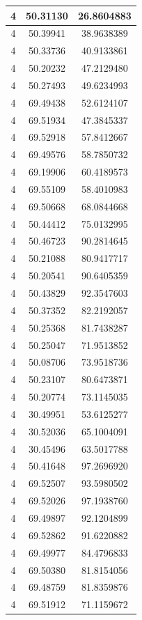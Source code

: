 \documentclass[
]{book}
\begin{document}
\begin{tabular}{c|c|c}
\hline
4 & 50.31130 & 26.8604883\\
\hline
4 & 50.39941 & 38.9638389\\
\hline
4 & 50.33736 & 40.9133861\\
\hline
4 & 50.20232 & 47.2129480\\
\hline
4 & 50.27493 & 49.6234993\\
\hline
4 & 69.49438 & 52.6124107\\
\hline
4 & 69.51934 & 47.3845337\\
\hline
4 & 69.52918 & 57.8412667\\
\hline
4 & 69.49576 & 58.7850732\\
\hline
4 & 69.19906 & 60.4189573\\
\hline
4 & 69.55109 & 58.4010983\\
\hline
4 & 69.50668 & 68.0844668\\
\hline
4 & 50.44412 & 75.0132995\\
\hline
4 & 50.46723 & 90.2814645\\
\hline
4 & 50.21088 & 80.9417717\\
\hline
4 & 50.20541 & 90.6405359\\
\hline
4 & 50.43829 & 92.3547603\\
\hline
4 & 50.37352 & 82.2192057\\
\hline
4 & 50.25368 & 81.7438287\\
\hline
4 & 50.25047 & 71.9513852\\
\hline
4 & 50.08706 & 73.9518736\\
\hline
4 & 50.23107 & 80.6473871\\
\hline
4 & 50.20774 & 73.1145035\\
\hline
4 & 30.49951 & 53.6125277\\
\hline
4 & 30.52036 & 65.1004091\\
\hline
4 & 30.45496 & 63.5017788\\
\hline
4 & 50.41648 & 97.2696920\\
\hline
4 & 69.52507 & 93.5980502\\
\hline
4 & 69.52026 & 97.1938760\\
\hline
4 & 69.49897 & 92.1204899\\
\hline
4 & 69.52862 & 91.6220882\\
\hline
4 & 69.49977 & 84.4796833\\
\hline
4 & 69.50380 & 81.8154056\\
\hline
4 & 69.48759 & 81.8359876\\
\hline
4 & 69.51912 & 71.1159672\\

\end{tabular}
\end{document}
